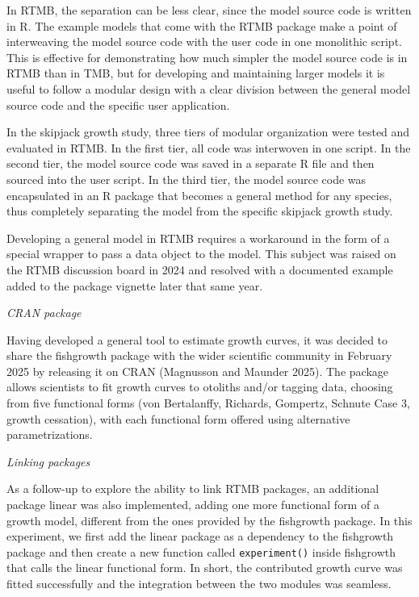 \documentclass{SCreport}
\begin{document}
In RTMB, the separation can be less clear, since the model source code is
written in R. The example models that come with the RTMB package make a point of
interweaving the model source code with the user code in one monolithic script.
This is effective for demonstrating how much simpler the model source code is in
RTMB than in TMB, but for developing and maintaining larger models it is useful
to follow a modular design with a clear division between the general model
source code and the specific user application.

In the skipjack growth study, three tiers of modular organization were tested
and evaluated in RTMB. In the first tier, all code was interwoven in one script.
In the second tier, the model source code was saved in a separate R file and
then sourced into the user script. In the third tier, the model source code was
encapsulated in an R package that becomes a general method for any species, thus
completely separating the model from the specific skipjack growth study.

Developing a general model in RTMB requires a workaround in the form of a
special wrapper to pass a data object to the model. This subject was raised on
the RTMB discussion board in 2024 and resolved with a documented example added
to the package vignette later that same year.

\vspace{2ex}

\textit{CRAN package}

Having developed a general tool to estimate growth curves, it was decided to
share the \textsf{fishgrowth} package with the wider scientific community in
February 2025 by releasing it on CRAN (Magnusson and Maunder 2025). The package
allows scientists to fit growth curves to otoliths and/or tagging data, choosing
from five functional forms (von Bertalanffy, Richards, Gompertz, Schnute Case 3,
growth cessation), with each functional form offered using alternative
parametrizations.

\newpage

\textit{Linking packages}

As a follow-up to explore the ability to link RTMB packages, an additional
package \textsf{linear} was also implemented, adding one more functional form of
a growth model, different from the ones provided by the \textsf{fishgrowth}
package. In this experiment, we first add the \textsf{linear} package as a
dependency to the \textsf{fishgrowth} package and then create a new function
called \texttt{experiment()} inside \textsf{fishgrowth} that calls the
\textsf{linear} functional form. In short, the contributed growth curve was
fitted successfully and the integration between the two modules was seamless.
\end{document}
